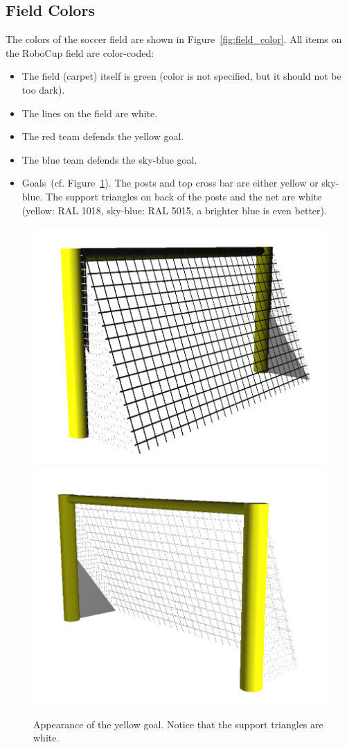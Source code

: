 \documentclass[12pt]{article}
\newcommand{\cf}{\mbox{cf.}\xspace}
\begin{document}
\subsection{Field Colors}

The colors of the soccer field are shown in Figure~\ref{fig:field_color}. All items on the RoboCup field are color-coded:

\begin{itemize}

\item The field (carpet) itself is green (color is not specified, but it should not be too dark).

\item The lines on the field are white.

\item The red team defends the yellow goal.

\item The blue team defends the sky-blue goal.

\item Goals~(\cf Figure~\ref{fig:goal_colors}). The posts and top cross bar are either yellow or sky-blue. The support triangles on back of the posts and the net are white (yellow: RAL 1018, sky-blue: RAL 5015, a brighter blue is even better).

\end{itemize}

\begin{figure}[htp]
\begin{center}
\leavevmode
\includegraphics[width=0.45\columnwidth]{figs/GoalBack}
\includegraphics[width=0.45\columnwidth]{figs/GoalFront}
\caption{Appearance of the yellow goal. Notice that the support triangles are white.}
\label{fig:goal_colors}
\end{center}
\end{figure}
\end{document}
